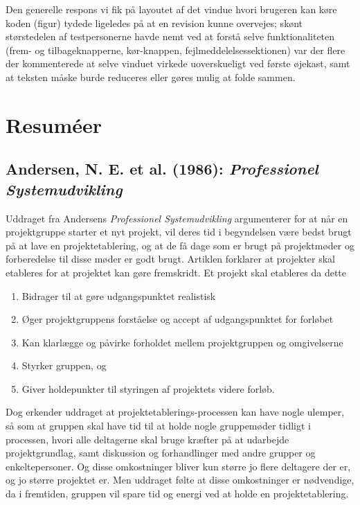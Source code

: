 \documentclass[10pt,a4paper,danish]{article}
\begin{document}
Den generelle respons vi fik på layoutet af det vindue hvori brugeren kan køre koden (figur) tydede ligeledes på at en revision kunne overvejes; skønt størstedelen af testpersonerne havde nemt ved at forstå selve funktionaliteten (frem- og tilbageknapperne, kør-knappen, fejlmeddelelsessektionen) var der flere der kommenterede at selve vinduet virkede uoverskueligt ved første øjekast, samt at teksten måske burde reduceres eller gøres mulig at folde sammen. 


\section{Resuméer}
\subsection{Andersen, N. E. et al. (1986): \emph{Professionel Systemudvikling}}
Uddraget fra Andersens \emph{Professionel Systemudvikling} argumenterer for at når en projektgruppe starter et
nyt projekt, vil deres tid i begyndelsen være bedst brugt på at lave en projektetablering, og at de få dage
som er brugt på projektmøder og forberedelse til disse møder er godt brugt.
Artiklen forklarer at projekter skal etableres for at projektet kan gøre fremskridt. Et projekt skal etableres
da dette
\begin{enumerate}
\item Bidrager til at gøre udgangspunktet realistisk
\item Øger projektgruppens forståelse og accept af udgangspunktet for forløbet
\item Kan klarlægge og påvirke forholdet mellem projektgruppen og omgivelserne
\item Styrker gruppen, og
\item Giver holdepunkter til styringen af projektets videre forløb.
\end{enumerate}
Dog erkender uddraget at projektetablerings-processen kan have nogle ulemper, så som at gruppen skal have tid til at holde nogle gruppemøder tidligt i processen, hvori alle deltagerne skal bruge kræfter på at udarbejde projektgrundlag, samt diskussion og forhandlinger med andre grupper og enkeltepersoner. Og disse omkostninger bliver kun større jo flere deltagere der er, og jo større projektet er. Men uddraget følte at disse omkostninger er nødvendige, da i fremtiden, gruppen vil spare tid og energi ved at holde en projektetablering.
\end{document}
